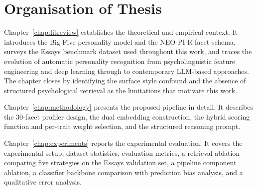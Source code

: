 \documentclass[../main.tex]{subfiles}
\begin{document}
\section{Organisation of Thesis}
\label{sec:organization}

Chapter~\ref{chap:litreview} establishes the theoretical and empirical context. It introduces the Big Five personality model and the NEO-PI-R facet schema, surveys the Essays benchmark dataset used throughout this work, and traces the evolution of automatic personality recognition from psycholinguistic feature engineering and deep learning through to contemporary LLM-based approaches. The chapter closes by identifying the surface style confound and the absence of structured psychological retrieval as the limitations that motivate this work.

Chapter~\ref{chap:methodology} presents the proposed pipeline in detail. It describes the 30-facet profiler design, the dual embedding construction, the hybrid scoring function and per-trait weight selection, and the structured reasoning prompt.

Chapter~\ref{chap:experiments} reports the experimental evaluation. It covers the experimental setup, dataset statistics, evaluation metrics, a retrieval ablation comparing five strategies on the Essays validation set, a pipeline component ablation, a classifier backbone comparison with prediction bias analysis, and a qualitative error analysis.
\end{document}
